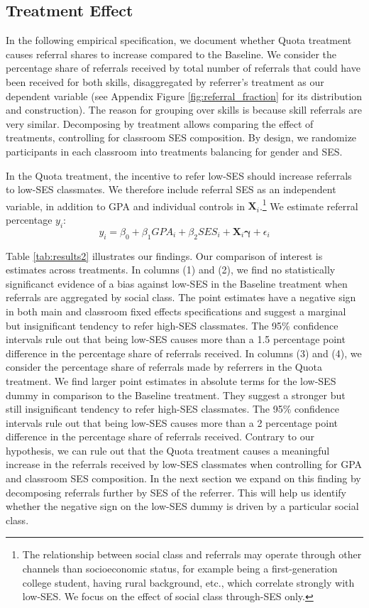 \documentclass[11pt,a4paper,oneside]{article}
\begin{document}
  \subsection{Treatment Effect}
  In the following empirical specification, we document whether Quota treatment causes referral shares to increase compared to the Baseline. We consider the percentage share of referrals received by total number of referrals that could have been received for both skills, disaggregated by referrer's treatment as our dependent variable (see Appendix Figure \ref{fig:referral_fraction} for its distribution and construction). The reason for grouping over skills is because skill referrals are very similar. Decomposing by treatment allows comparing the effect of treatments, controlling for classroom SES composition. By design, we randomize participants in each classroom into treatments balancing for gender and SES. 
  
  In the Quota treatment, the incentive to refer low-SES should increase referrals to low-SES classmates. We therefore include referral SES as an independent variable, in addition to GPA and individual controls in $\mathbf{X}_{i}$.\footnote{The relationship between social class and referrals may operate through other channels than socioeconomic status, for example being a first-generation college student, having rural background, etc., which correlate strongly  with low-SES. We focus on the effect of social class through-SES only.} We estimate referral percentage $y_{i}$: 
  \begin{equation}\label{eq2}
    y_{i} = \beta_0 + \beta_1{GPA}_{i} + \beta_2{SES}_{i} + \mathbf{X}_{i}\boldsymbol{\gamma} + \epsilon_{i}    
  \end{equation}

  Table \ref{tab:results2} illustrates our findings. Our comparison of interest is estimates across treatments. In columns (1) and (2), we find no statistically significanct evidence of a bias against low-SES in the Baseline treatment when referrals are aggregated by social class. The point estimates have a negative sign in both main and classroom fixed effects specifications and suggest a marginal but insignificant tendency to refer high-SES classmates. The 95\% confidence intervals rule out that being low-SES causes more than a 1.5 percentage point difference in the percentage share of referrals received. In columns (3) and (4), we consider the percentage share of referrals made by referrers in the Quota treatment. We find larger point estimates in absolute terms for the low-SES dummy in comparison to the Baseline treatment. They suggest a stronger but still insignificant tendency to refer high-SES classmates. The 95\% confidence intervals rule out that being low-SES causes more than a 2 percentage point difference in the percentage share of referrals received. Contrary to our hypothesis, we can rule out that the Quota treatment causes a meaningful increase in the referrals received by low-SES classmates when controlling for GPA and classroom SES composition. In the next section we expand on this finding by decomposing referrals further by SES of the referrer. This will help us identify whether the negative sign on the low-SES dummy is driven by a particular social class.  
  
\end{document}
